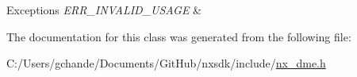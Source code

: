 \begin{DoxyExceptions}{Exceptions}
{\em E\+R\+R\+\_\+\+I\+N\+V\+A\+L\+I\+D\+\_\+\+U\+S\+A\+GE} & \\
\hline
\end{DoxyExceptions}


The documentation for this class was generated from the following file\+:\begin{DoxyCompactItemize}
\item 
C\+:/\+Users/gchande/\+Documents/\+Git\+Hub/nxsdk/include/\mbox{\hyperlink{nx__dme_8h}{nx\+\_\+dme.\+h}}\end{DoxyCompactItemize}
